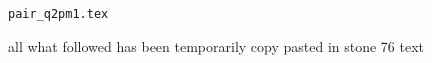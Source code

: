 \begin{flushright} {\tiny {\color{gray} \tt pair\_q2pm1.tex}} \end{flushright}

{\color{red} all what followed has been temporarily copy pasted in stone 76 text}








